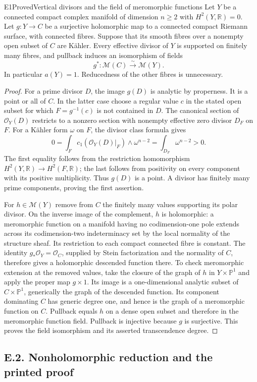 \begin{statement}{E1}{Proved}{Vertical divisors and the field of meromorphic functions}
Let $Y$ be a connected compact complex manifold of dimension $n\geq2$
with $H^2(Y,\mathbb R)=0$. Let $g:Y\to C$ be a surjective holomorphic
map to a connected compact Riemann surface, with connected fibres.
Suppose that its smooth fibres over a nonempty open subset of $C$ are
K\"ahler. Every effective divisor of $Y$ is supported on finitely many
fibres, and pullback induces an isomorphism of fields
\[
 g^*: \mathcal M(C)\xrightarrow{\ \sim\ }\mathcal M(Y).
\]
In particular $a(Y)=1$. Reducedness of the other fibres is unnecessary.
\end{statement}
\begin{proof}
For a prime divisor $D$, the image $g(D)$ is analytic by properness. It
is a point or all of $C$. In the latter case choose a regular value $c$
in the stated open subset for which $F=g^{-1}(c)$ is not contained in
$D$. The canonical section of $\mathcal O_Y(D)$ restricts to a nonzero
section with nonempty effective zero divisor $D_F$ on $F$. For a
K\"ahler form $\omega$ on $F$, the divisor class formula gives
\[
 0=\int_F c_1(\mathcal O_Y(D)|_F)\wedge\omega^{n-2}
   =\int_{D_F}\omega^{n-2}>0.
\]
The first equality follows from the restriction homomorphism
$H^2(Y,\mathbb R)\to H^2(F,\mathbb R)$; the last follows from positivity
on every component with its positive multiplicity. Thus $g(D)$ is a
point. A divisor has finitely many prime components, proving the first
assertion.

For $h\in\mathcal M(Y)$ remove from $C$ the finitely many values
supporting its polar divisor. On the inverse image of the complement,
$h$ is holomorphic: a meromorphic function on a manifold having no
codimension-one pole extends across its codimension-two indeterminacy
set by the local normality of the structure sheaf. Its restriction to
each compact connected fibre is constant. The identity
$g_*\mathcal O_Y=\mathcal O_C$, supplied by Stein factorization and
the normality of $C$, therefore gives a holomorphic descended function
there. To check meromorphic extension at the removed values, take the
closure of the graph of $h$ in $Y\times\mathbb P^1$ and apply the proper
map $g\times1$. Its image is a one-dimensional analytic subset of
$C\times\mathbb P^1$, generically the graph of the descended function.
Its component dominating $C$ has generic degree one, and hence is the
graph of a meromorphic function on $C$. Pullback equals $h$ on a dense
open subset and therefore in the meromorphic function field. Pullback
is injective because $g$ is surjective. This proves the field
isomorphism and its asserted transcendence degree.
\end{proof}


\subsection{E.2. Nonholomorphic reduction and the printed proof}


